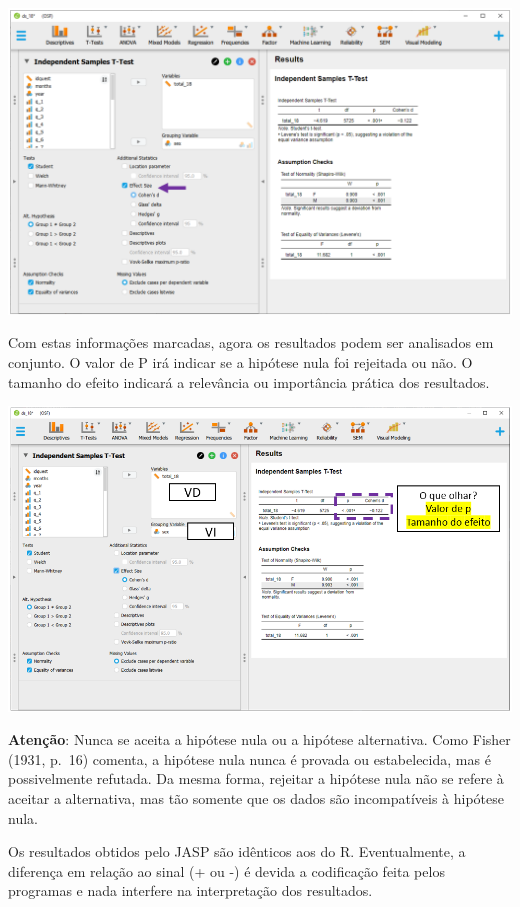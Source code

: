 \documentclass[
]{book}
\begin{document}
\includegraphics{./img/cap_testet_tamanho_do_efeito.png}

Com estas informações marcadas, agora os resultados podem ser analisados em conjunto. O valor de P irá indicar se a hipótese nula foi rejeitada ou não. O tamanho do efeito indicará a relevância ou importância prática dos resultados.

\includegraphics{./img/cap_testet_resultados.png}

\begin{warning}

\textbf{Atenção}: Nunca se aceita a hipótese nula ou a hipótese alternativa. Como Fisher (1931, p.~16) comenta, a hipótese nula nunca é provada ou estabelecida, mas é possivelmente refutada. Da mesma forma, rejeitar a hipótese nula não se refere à aceitar a alternativa, mas tão somente que os dados são incompatíveis à hipótese nula.

\end{warning}

Os resultados obtidos pelo JASP são idênticos aos do R. Eventualmente, a diferença em relação ao sinal (+ ou -) é devida a codificação feita pelos programas e nada interfere na interpretação dos resultados.
\end{document}
